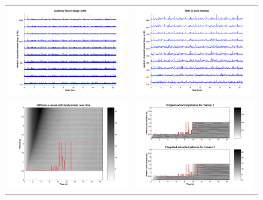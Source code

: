 \begin{figure}[p]
    \begin{tabular}{cc}
        \includegraphics[width=7.5cm]{Graphics/MECDemoTomWaitsBigInJapanANI} & \includegraphics[width=7.5cm]{Graphics/MECDemoTomWaitsBigInJapanANIRMS}\\
        \includegraphics[width=7.5cm]{Graphics/MECDemoTomWaitsBigInJapanValues} & \includegraphics[width=7.5cm]{Graphics/MECDemoTomWaitsBigInJapanIntegrPattCh1}\\

\end{tabular}
\end{figure}
